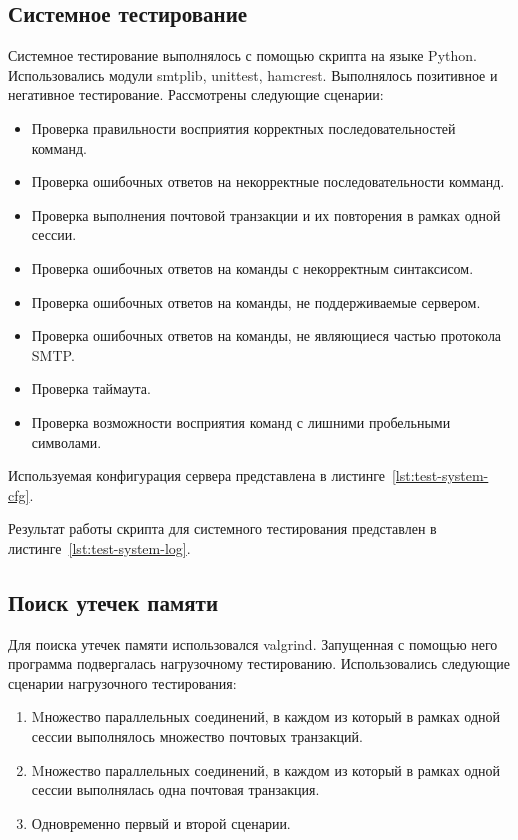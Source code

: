 \subsection{Системное тестирование}

Системное тестирование выполнялось с помощью скрипта на языке Python.
Использовались модули smtplib, unittest, hamcrest.
Выполнялось позитивное и негативное тестирование.
Рассмотрены следующие сценарии:

\begin{itemize}
\item Проверка правильности восприятия корректных последовательностей комманд.
\item Проверка ошибочных ответов на некорректные последовательности комманд.
\item Проверка выполнения почтовой транзакции и их повторения в рамках одной сессии.
\item Проверка ошибочных ответов на команды с некорректным синтаксисом.
\item Проверка ошибочных ответов на команды, не поддерживаемые сервером.
\item Проверка ошибочных ответов на команды, не являющиеся частью протокола SMTP.
\item Проверка таймаута.
\item Проверка возможности восприятия команд с лишними пробельными символами.
\end{itemize}

Используемая конфигурация сервера представлена в листинге~\ref{lst:test-system-cfg}.



Результат работы скрипта для системного тестирования представлен в листинге~\ref{lst:test-system-log}.



\subsection{Поиск утечек памяти}

Для поиска утечек памяти использовался valgrind.
Запущенная с помощью него программа подвергалась нагрузочному тестированию.
Использовались следующие сценарии нагрузочного тестирования:
\begin{enumerate}
\item Mножество параллельных соединений, в каждом из который в рамках одной сессии выполнялось множество почтовых транзакций.
\item Mножество параллельных соединений, в каждом из который в рамках одной сессии выполнялась одна почтовая транзакция.
\item Одновременно первый и второй сценарии.
\end{enumerate}

